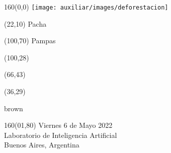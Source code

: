 \documentclass[shownotes,aspectratio=169]{beamer}
\begin{document}
\color{black!85}
\large

 

\begin{frame}


\begin{textblock}{160}(0,0)
\texttt{[image: auxiliar/images/deforestacion]}
\end{textblock}

\begin{textblock}{80}(22,10)
\textcolor{black!15}{\fontsize{44}{55}\selectfont Pacha}
\end{textblock}

\begin{textblock}{47}(100,70)
\centering \textcolor{black!5}{{\fontsize{52}{65}\selectfont Pampas}}
\end{textblock}

\begin{textblock}{80}(100,28)
\LARGE  \textcolor{black!15}{}
\end{textblock}


\begin{textblock}{80}(66,43)
\LARGE  \textcolor{black!15}{\scalebox{6}{$=$}}
\end{textblock}

\begin{textblock}{80}(36,29)
\LARGE  \textcolor{black!15}{\scalebox{9}{$p$}}
\end{textblock}

 \vspace{2cm}brown
\maketitle


\begin{textblock}{160}(01,80)
\scriptsize \textcolor{black!5}{Viernes 6 de Mayo 2022 \\ Laboratorio de Inteligencia Artificial \\ Buenos Aires, Argentina}
\end{textblock} 

\end{frame}
\end{document}

